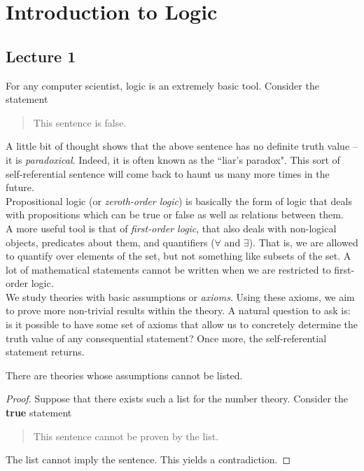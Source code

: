\section{Introduction to Logic}

\subsection{Lecture 1}

For any computer scientist, logic is an extremely basic tool. Consider the statement
\begin{quote}
    This sentence is false.
\end{quote}
A little bit of thought shows that the above sentence has no definite truth value -- it is \textit{paradoxical}. Indeed, it is often known as the ``liar's paradox". This sort of self-referential sentence will come back to haunt us many more times in the future.\\

Propositional logic (or \textit{zeroth-order logic}) is basically the form of logic that deals with propositions which can be true or false as well as relations between them.\\
A more useful tool is that of \textit{first-order logic}, that also deals with non-logical objects, predicates about them, and quantifiers ($\forall$ and $\exists$). That is, we are allowed to quantify over elements of the set, but not something like subsets of the set. A lot of mathematical statements cannot be written when we are restricted to first-order logic.\\

We study theories with basic assumptions or \textit{axioms}. Using these axioms, we aim to prove more non-trivial results within the theory. A natural question to ask is: is it possible to have some set of axioms that allow us to concretely determine the truth value of any consequential statement? Once more, the self-referential statement returns.

\begin{theorem}
There are theories whose assumptions cannot be listed.
\end{theorem}
\begin{proof}
Suppose that there exists such a list for the number theory. Consider the \textbf{true} statement
\begin{quote}
    This sentence cannot be proven by the list.
\end{quote}
The list cannot imply the sentence. This yields a contradiction.
\end{proof}

